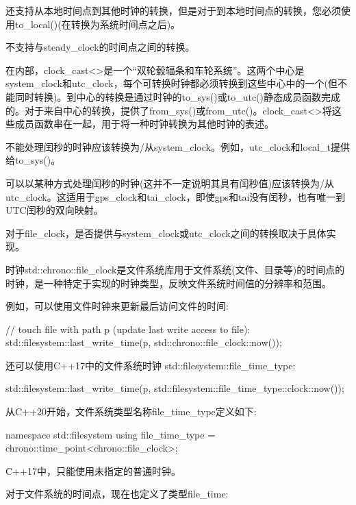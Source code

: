 还支持从本地时间点到其他时钟的转换，但是对于到本地时间点的转换，您必须使用to\_local()(在转换为系统时间点之后)。

不支持与steady\_clock的时间点之间的转换。


在内部，clock\_cast<>是一个“双轮毂辐条和车轮系统”。这两个中心是system\_clock和utc\_clock，每个可转换时钟都必须转换到这些中心中的一个(但不能同时转换)。到中心的转换是通过时钟的to\_sys()或to\_utc()静态成员函数完成的。对于来自中心的转换，提供了from\_sys()或from\_utc()。clock\_cast<>将这些成员函数串在一起，用于将一种时钟转换为其他时钟的表述。

不能处理闰秒的时钟应该转换为/从system\_clock。例如，utc\_clock和local\_t提供给to\_sys()。

可以以某种方式处理闰秒的时钟(这并不一定说明其具有闰秒值)应该转换为/从utc\_clock。这适用于gps\_clock和tai\_clock，即使gps和tai没有闰秒，也有唯一到UTC闰秒的双向映射。

对于file\_clock，是否提供与system\_clock或utc\_clock之间的转换取决于具体实现。



时钟std::chrono::file\_clock是文件系统库用于文件系统(文件、目录等)的时间点的时钟，是一种特定于实现的时钟类型，反映文件系统时间值的分辨率和范围。

例如，可以使用文件时钟来更新最后访问文件的时间:

\begin{cpp}
// touch file with path p (update last write access to file):
std::filesystem::last_write_time(p,
								 std::chrono::file_clock::now());
\end{cpp}

还可以使用C++17中的文件系统时钟
std::filesystem::file\_time\_type:

\begin{cpp}
	std::filesystem::last_write_time(p,
									std::filesystem::file_time_type::clock::now());
\end{cpp}

从C++20开始，文件系统类型名称file\_time\_type定义如下:

\begin{cpp}
namespace std::filesystem {
	using file_time_type = chrono::time_point<chrono::file_clock>;
}
\end{cpp}

C++17中，只能使用未指定的普通时钟。

对于文件系统的时间点，现在也定义了类型file\_time:


